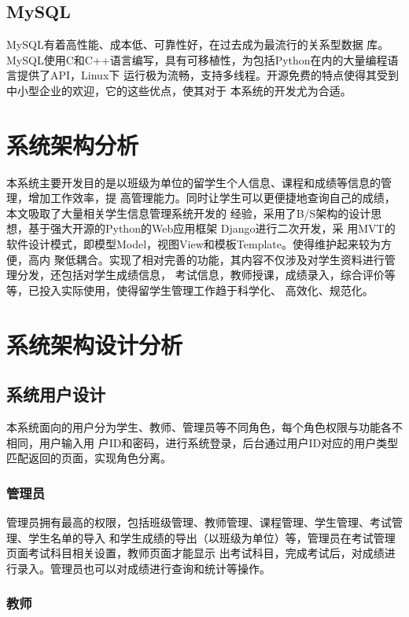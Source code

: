 \documentclass{ede}
\begin{document}
\subsection{MySQL}

MySQL\cite{苟文博2017基于}有着高性能、成本低、可靠性好，在过去成为最流行的关系型数据
库。MySQL使用C和C++语言编写，具有可移植性，为包括Python在内的大量编程语言提供了API，Linux下
运行极为流畅，支持多线程。开源免费的特点使得其受到中小型企业的欢迎，它的这些优点，使其对于
本系统的开发尤为合适。

\section{系统架构分析}

本系统主要开发目的是以班级为单位的留学生个人信息、课程和成绩等信息的管理，增加工作效率，提
高管理能力。同时让学生可以更便捷地查询自己的成绩，本文吸取了大量相关学生信息管理系统开发的
经验，采用了B/S架构的设计思想，基于强大开源的Python的Web应用框架 Django进行二次开发，采
用MVT的软件设计模式，即模型Model，视图View和模板Template。使得维护起来较为方便，高内
聚低耦合。实现了相对完善的功能，其内容不仅涉及对学生资料进行管理分发，还包括对学生成绩信息，
考试信息，教师授课，成绩录入，综合评价等等，已投入实际使用，使得留学生管理工作趋于科学化、
高效化、规范化。

\section{系统架构设计分析}

\subsection{系统用户设计}

本系统面向的用户分为学生、教师、管理员等不同角色，每个角色权限与功能各不相同，用户输入用
户ID和密码，进行系统登录，后台通过用户ID对应的用户类型匹配返回的页面，实现角色分离。

\subsubsection{管理员}

管理员拥有最高的权限，包括班级管理、教师管理、课程管理、学生管理、考试管理、学生名单的导入
和学生成绩的导出（以班级为单位）等，管理员在考试管理页面考试科目相关设置，教师页面才能显示
出考试科目，完成考试后，对成绩进行录入。管理员也可以对成绩进行查询和统计等操作。

\subsubsection{教师}
\end{document}
